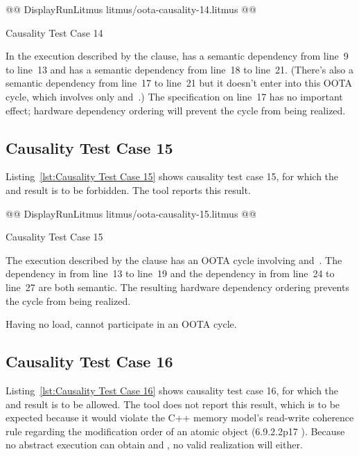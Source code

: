 \documentclass[10]{article}
\begin{document}
\begin{listing}[tbp]
@@ DisplayRunLitmus litmus/oota-causality-14.litmus @@
\caption{Causality Test Case 14}
\label{lst:Causality Test Case 14}
\end{listing}

In the execution described by the  clause,
 has a semantic dependency from line~9 to
line~13 and  has a semantic dependency from line~18 to
line~21.
(There's also a semantic dependency from line~17 to line~21 but it
doesn't enter into this OOTA cycle, which involves only  and~.)
The  specification on line~17 has no important effect;
hardware dependency ordering will prevent the cycle from being realized.

\subsection{Causality Test Case 15}
\label{app:Causality Test Case 15}

Listing~\ref{lst:Causality Test Case 15}
shows causality test case 15, for which the 
and 
result is to be forbidden.
The  tool reports this result.

\begin{listing}[tbp]
@@ DisplayRunLitmus litmus/oota-causality-15.litmus @@
\caption{Causality Test Case 15}
\label{lst:Causality Test Case 15}
\end{listing}

The execution described by the  clause
has an OOTA cycle involving  and~.
The dependency in  from line~13 to line~19 and the dependency
in  from line~24 to line~27 are both semantic.
The resulting hardware dependency ordering prevents the cycle from
being realized.

Having no load,  cannot participate in an OOTA cycle.

\subsection{Causality Test Case 16}
\label{app:Causality Test Case 16}

Listing~\ref{lst:Causality Test Case 16}
shows causality test case 16, for which the  and 
result is to be allowed.
The  tool does not report this result, which is to be
expected because it would violate the C++ memory model's read-write
coherence rule regarding the modification order of an atomic object
(6.9.2.2p17 ).
Because no abstract execution can obtain  and , no
valid realization will either.
\end{document}
